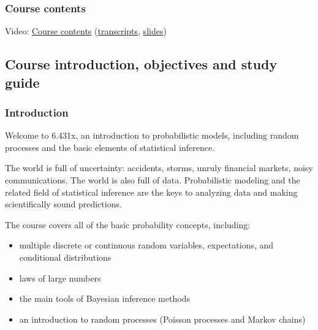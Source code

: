 \documentclass[pdftex, brazil, 12pt, twoside]{article}
\begin{document}
\subsubsection{Course contents}
\label{ovw0-co-contents}

Video: \href{https://www.youtube.com/watch?v=6EZKb-Lo9IQ}{Course contents}
(\href{Unit-0/Overview3\_transcripts.pdf}{transcripts}, \href{Unit-0/Overview3\_slides.pdf}{slides})


\subsection{Course introduction, objectives and study guide}
\label{ovw0-ci}

\subsubsection{Introduction}
\label{ovw0-ci-intro}

Welcome to 6.431x, an introduction to probabilistic models, including random
processes and the basic elements of statistical inference.

The world is full of uncertainty: accidents, storms, unruly financial markets,
noisy communications. The world is also full of data. Probabilistic modeling and
the related field of statistical inference are the keys to analyzing data and making
scientifically sound predictions.

The course covers all of the basic probability concepts, including:

\begin{itemize}[noitemsep]
\item multiple discrete or continuous random variables, expectations, and conditional distributions
\item laws of large numbers
\item the main tools of Bayesian inference methods
\item an introduction to random processes (Poisson processes and Markov chains)
\end{itemize}

\end{document}
